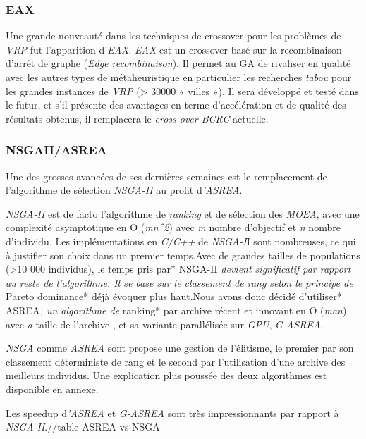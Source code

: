\documentclass[french, 11pt]{memoir}
\begin{document}
\subsubsection{EAX}\label{eax}

Une grande nouveauté dans les techniques de crossover pour les problèmes
de \emph{VRP} fut l'apparition d'\emph{EAX}. \emph{EAX} est un crossover
basé sur la recombinaison d'arrêt de graphe (\emph{Edge recombinaison}).
Il permet au GA de rivaliser en qualité avec les autres types de
métaheuristique en particulier les recherches \emph{tabou} pour les
grandes instances de \emph{VRP} (\textgreater{} 30000 « villes »). Il
sera développé et testé dans le futur, et s'il présente des avantages en
terme d'accélération et de qualité des résultats obtenus, il remplacera
le \emph{cross-over BCRC} actuelle.

\subsubsection{NSGAII/ASREA}\label{nsgaiiasrea}

Une des grosses avancées de ses dernières semaines est le remplacement
de l'algorithme de sélection \emph{NSGA-II} au profit d\emph{'ASREA}.

\emph{NSGA-II} est de facto l'algorithme de \emph{ranking} et de
sélection des \emph{MOEA}, avec une complexité asymptotique en O
(\emph{mn\^{}2}) avec \emph{m} nombre d'objectif et \emph{n} nombre
d'individu. Les implémentations en \emph{C/C++} de \emph{NSGA-I}I sont
nombreuses, ce qui à justifier son choix dans un premier temps.Avec de
grandes tailles de populations (\textgreater{}10 000 individus), le
temps pris par* NSGA-II \emph{devient significatif par rapport au reste
	de l'algorithme. Il se base sur le classement de rang selon le principe
	de }Pareto dominance* déjà évoquer plus haut.Nous avons donc décidé
d'utiliser* ASREA\emph{, un algorithme de }ranking* par archive récent
et innovant en O (\emph{man}) avec \emph{a} taille de l'archive , et sa
variante parallélisée sur \emph{GPU}, \emph{G-ASREA}.

\emph{NSGA} comme \emph{ASREA} sont propose une gestion de l'élitisme,
le premier par son classement déterministe de rang et le second par
l'utilisation d'une archive des meilleurs individus. Une explication
plus poussée des deux algorithmes est disponible en annexe.

Les speedup d\emph{'ASREA} et \emph{G-ASREA} sont très impressionnants
par rapport à \emph{NSGA-II}.//table ASREA vs NSGA
\end{document}
